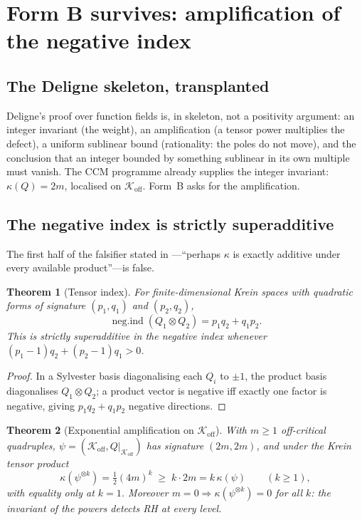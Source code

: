 \documentclass[11pt]{amsart}
\newtheorem{theorem}{Theorem}[section]
\theoremstyle{definition}
\theoremstyle{remark}
\newcommand{\Koff}{\mathcal{K}_{\mathrm{off}}}
\newcommand{\negind}{\operatorname{neg.ind}}
\begin{document}
\section{Form B survives: amplification of the negative index}\label{sec:formB}

\subsection{The Deligne skeleton, transplanted}
Deligne's proof over function fields \cite{Del74} is, in skeleton, not a
positivity argument: an integer invariant (the weight), an amplification
(a tensor power multiplies the defect), a uniform sublinear bound
(rationality: the poles do not move), and the conclusion that an integer
bounded by something sublinear in its own multiple must vanish. The CCM
programme already supplies the integer invariant: $\kappa(Q)=2m$, localised
on $\Koff$. Form~B asks for the amplification.

\subsection{The negative index is strictly superadditive}
The first half of the falsifier stated in \cite[\S7]{P41}---``perhaps
$\kappa$ is exactly additive under every available product''---is false.

\begin{theorem}[Tensor index]\label{thm:tensor-index}
For finite-dimensional Krein spaces with quadratic forms of signature
$(p_1,q_1)$ and $(p_2,q_2)$,
\[
\negind(Q_1\otimes Q_2)=p_1q_2+q_1p_2.
\]
This is strictly superadditive in the negative index whenever
$(p_1-1)q_2+(p_2-1)q_1>0$.
\end{theorem}

\begin{proof}
In a Sylvester basis diagonalising each $Q_i$ to $\pm1$, the product basis
diagonalises $Q_1\otimes Q_2$; a product vector is negative iff exactly one
factor is negative, giving $p_1q_2+q_1p_2$ negative directions.
\end{proof}

\begin{theorem}[Exponential amplification on $\Koff$]\label{thm:amplify}
With $m\ge1$ off-critical quadruples, $\psi=(\Koff,Q|_{\Koff})$ has
signature $(2m,2m)$, and under the Krein tensor product
\[
\kappa(\psi^{\otimes k})=\tfrac12(4m)^k\;\ge\;k\cdot2m=k\,\kappa(\psi)
\qquad(k\ge1),
\]
with equality only at $k=1$. Moreover $m=0\Rightarrow\kappa(\psi^{\otimes k})=0$
for all $k$: the invariant of the powers detects RH at every level.
\end{theorem}
\end{document}
